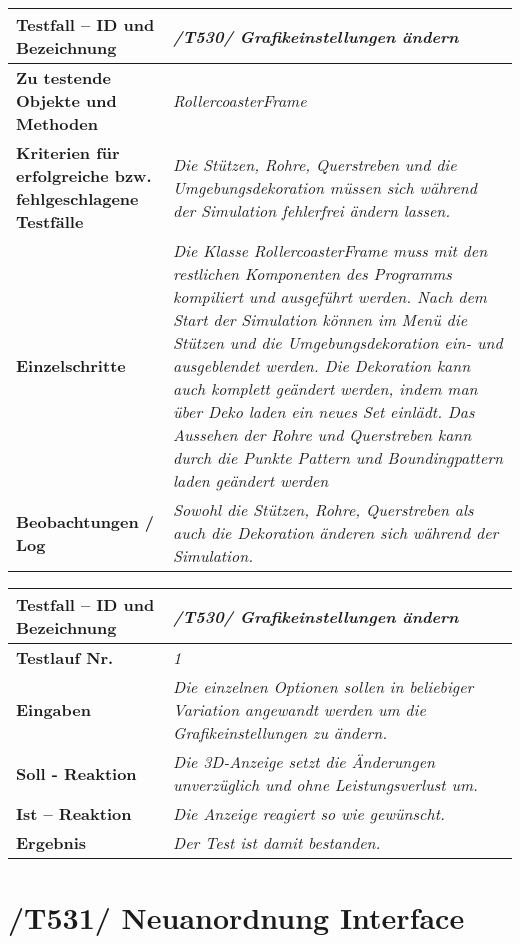 \begin{longtable}{|p{7cm}|p{10cm}|}
\hline
\textbf{Testfall -- ID und Bezeichnung} &  \textit{/T530/ Grafikeinstellungen ändern} \\
\hline
\textbf{Zu testende Objekte und Methoden} &  \textit{RollercoasterFrame}
\\
\hline
\textbf{Kriterien für erfolgreiche bzw. fehlgeschlagene Testfälle} &
\textit{Die Stützen, Rohre, Querstreben und die Umgebungsdekoration müssen sich während der Simulation fehlerfrei ändern lassen.} \\
\hline
\textbf{Einzelschritte} &  \textit{Die Klasse RollercoasterFrame muss mit den restlichen Komponenten des Programms kompiliert und ausgeführt werden. Nach dem Start der Simulation können im Menü
die Stützen und die Umgebungsdekoration ein- und ausgeblendet werden. Die Dekoration kann auch komplett geändert werden, indem man über Deko laden ein neues Set einlädt. Das Aussehen der
Rohre und Querstreben kann durch die Punkte Pattern und Boundingpattern laden geändert werden} \\
\hline
\textbf{Beobachtungen / Log} &  \textit{Sowohl die Stützen, Rohre, Querstreben als auch die Dekoration änderen sich während der Simulation.} \\
\hline
\end{longtable}

\begin{longtable}{|p{7cm}|p{10cm}|}
\hline
\textbf{Testfall -- ID und Bezeichnung} & \textit{ /T530/ Grafikeinstellungen ändern} \\
\hline
\textbf{Testlauf Nr.} & \textit{1} \\
\hline
\textbf{Eingaben} & \textit{Die einzelnen Optionen sollen in beliebiger Variation angewandt werden um die Grafikeinstellungen zu ändern.} \\
\hline
\textbf{Soll - Reaktion} & \textit{Die 3D-Anzeige setzt die Änderungen unverzüglich und ohne Leistungsverlust um.} \\
\hline
\textbf{Ist -- Reaktion} & \textit{Die Anzeige reagiert so wie gewünscht.} \\
\hline
\textbf{Ergebnis} & \textit{Der Test ist damit bestanden.} \\
\hline
\end{longtable}

\section{/T531/ Neuanordnung Interface}

